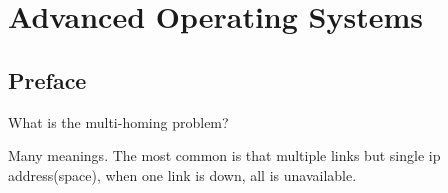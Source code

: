 %
%
%

\chapter{Advanced Operating Systems}
\label{intro} %


\section{Preface}
\label{sec:1}

What is the multi-homing problem?

Many meanings. The most common is that multiple links but single ip address(space), when one link is down, all is unavailable.


